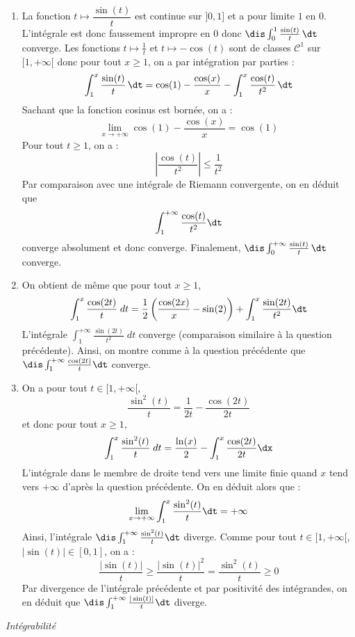 \documentclass[a4paper,10pt]{report}
\begin{document}
\corr 
\begin{enumerate}
\item La fonction $t\mapsto \dfrac{\sin(t)}{t}$ est continue sur $]0,1]$ et a pour limite $1$ en $0$. L'intégrale est donc faussement impropre en $0$ donc $\dis \int_0^1\frac{\sin(t)}{t}\, \dt$ converge. Les fonctions $t \mapsto \frac{1}{t}$ et $t \mapsto - \cos(t)$ sont de classes $\mathcal{C}^1$ sur $[1, + \infty[$ donc pour tout $x \geq 1$, on a par intégration par parties :
\[\int_1^x\frac{\sin(t)}{t}\, \dt=\cos(1)-\frac{\cos(x)}{x}-\int_1^x\frac{\cos(t)}{t^2}\, \dt\]
Sachant que la fonction cosinus est bornée, on a :
$$ \lim_{x \rightarrow + \infty} \cos(1)-\frac{\cos(x)}{x} = \cos(1)$$
Pour tout $t \geq 1$, on a :
$$ \left\vert \frac{\cos(t)}{t^2} \right\vert \leq \frac{1}{t^2}$$
Par comparaison avec une intégrale de Riemann convergente, on en déduit que 
$$ \int_{1}^{+ \infty} \frac{\cos(t)}{t^2} \dt$$
converge absolument et donc converge. Finalement, $\dis \int_0^{+ \infty} \frac{\sin(t)}{t}\, \dt$ converge.  
\item On obtient de m\^eme  que pour tout $x \geq 1$,
\[\int_1^x\frac{\cos(2t)}{t}\;dt=\frac{1}{2}\left (\frac{\cos(2x)}{x}-\sin(2)\right )+\int_1^x\frac{\sin(2t)}{t^2}\dt\]
L'intégrale $\int_1^{+ \infty} \frac{\sin(2t)}{t^2}\;dt$ converge (comparaison similaire à la question précédente). Ainsi, on montre comme \`a la question pr\'ec\'edente que $\dis \int_1^{+\infty}\frac{\cos(2t)}{t}\dt$ converge.
\item On a pour tout $t \in [1, + \infty[$,
$$\frac{\sin^2(t)}{t}=\frac{1}{2t}-\frac{\cos(2t)}{2t}$$
 et donc pour tout $x \geq 1$,
\[\int_1^x\frac{\sin^2(t)}{t}\;dt=\frac{\ln(x)}{2}-\int_1^x\frac{\cos(2t)}{2t}\dx\]
L'intégrale dans le membre de droite tend vers une limite finie quand $x$ tend vers $+ \infty$ d'après la question précédente. On en déduit alors que :
$$ \lim_{x \rightarrow + \infty} \int_1^x\frac{\sin^2(t)}{t}\dt = + \infty$$
 Ainsi, l'int\'egrale $\dis \int_1^{+\infty}\frac{\sin^2(t)}{t}\dt$ diverge.
Comme pour tout $t \in [1, + \infty[$, $\vert \sin(t) \vert \in [0,1]$, on a :
$$\frac{\vert \sin(t) \vert}{t} \geq \frac{\vert \sin(t)\vert^2}{t} = \frac{\sin^2(t)}{t}\geq0$$
Par divergence de l'intégrale précédente et par positivité des intégrandes, on en déduit que $\dis \int_1^{+\infty}\frac{|\sin(t)|}{t}\dt$ diverge.
\end{enumerate}

\medskip

\begin{center}
\textit{{ {\large Intégrabilité}}}
\end{center}
\end{document}
